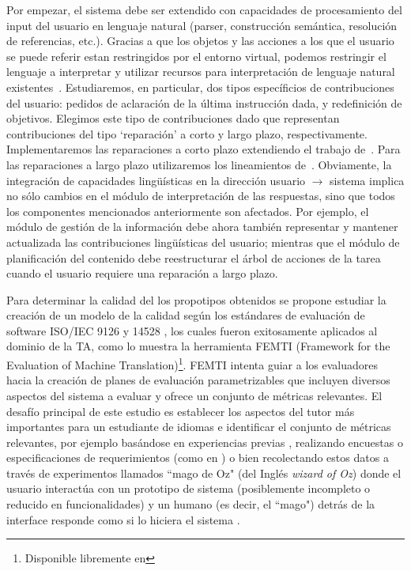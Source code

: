 Por empezar, el sistema debe ser extendido con capacidades de procesamiento 
del input del usuario en lenguaje natural (parser, construcci\'on sem\'antica, 
resoluci\'on de referencias, etc.).  Gracias a que los objetos y las acciones 
a los que el usuario se puede referir estan restringidos por el entorno virtual, 
podemos restringir el lenguaje 
a interpretar y utilizar recursos para interpretaci\'on de lenguaje natural
existentes~\citep{kow06}.  Estudiaremos, en particular, dos 
tipos espec\'ificios de contribuciones del usuario: pedidos de aclaraci\'on 
de la \'ultima instrucci\'on dada, y redefinici\'on de objetivos.  Elegimos 
este tipo de contribuciones dado que representan contribuciones del tipo
`reparaci\'on' a corto y largo plazo, respectivamente. Implementaremos las
reparaciones a corto plazo extendiendo el trabajo de~\cite{purver06}.  Para 
las reparaciones a largo plazo utilizaremos los lineamientos
de~\cite{blaylock05a,blaylock05b}.  Obviamente, la integraci\'on de capacidades
ling\"u\'isticas en la direcci\'on usuario $\to$ sistema implica no s\'olo 
cambios en el m\'odulo de interpretaci\'on de las respuestas, sino que todos los componentes mencionados 
anteriormente son afectados.  Por ejemplo, el m\'odulo de gesti\'on de la 
informaci\'on debe ahora tambi\'en representar y mantener actualizada las
contribuciones ling\"u\'isticas del usuario; mientras que el m\'odulo de
planificaci\'on del contenido debe reestructurar el \'arbol de acciones
de la tarea cuando el usuario requiere una reparaci\'on a largo plazo.  

Para determinar la calidad del los propotipos obtenidos se propone
estudiar la creaci\'on de un modelo de la calidad seg\'un los est\'andares de
evaluaci\'on de software ISO/IEC 9126 y 14528 \citep{ISO9126-1, ISO14598-1}, los
cuales fueron exitosamente aplicados al dominio de la TA, como lo muestra la
herramienta FEMTI (Framework for the Evaluation of Machine 
Translation)\footnote{Disponible libremente en }. FEMTI
\citep{Est2005} intenta guiar a los evaluadores hacia la creaci\'on de planes de
evaluaci\'on parametrizables que incluyen diversos aspectos del sistema a evaluar
y ofrece un conjunto de m\'etricas relevantes. El desaf\'io principal de este
estudio es establecer los aspectos del tutor m\'as importantes para un
estudiante de idiomas e identificar el conjunto de m\'etricas relevantes, por
ejemplo bas\'andose en experiencias previas \citep{paradise06, Chu2000,
Litman2002}, realizando encuestas o especificaciones de requerimientos (como en
\citep{Lecoeuche98}) o bien recolectando estos datos a trav\'es de experimentos
llamados ``mago de Oz" (del Ingl\'es \textit{wizard of Oz}) donde el usuario
interact\'ua con un prototipo de sistema (posiblemente incompleto o reducido en
funcionalidades) y un humano (es decir, el ``mago") detr\'as de la interface
responde como si lo hiciera el sistema \citep{Dahlback93, Fabbrizio05}.

